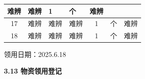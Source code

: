 \documentclass[UTF8,10pt,a4paper,fontset=fandol]{ctexart}
\newcommand{\fieldvalue}[1]{#1}
\newcommand{\handwritten}[1]{#1}
\begin{document}
\begin{tabularx}{\textwidth}{c|X|X|X|c|c|X}
\fieldvalue{\handwritten{难辨}} &
\fieldvalue{\handwritten{难辨}} &
\fieldvalue{\handwritten{1}} &
个 &
\fieldvalue{\handwritten{难辨}}\\
\hline
17 &
\fieldvalue{\handwritten{难辨}} &
\fieldvalue{\handwritten{难辨}} &
\fieldvalue{\handwritten{难辨}} &
\fieldvalue{\handwritten{1}} &
个 &
\fieldvalue{\handwritten{难辨}}\\
\hline
18 &
\fieldvalue{\handwritten{难辨}} &
\fieldvalue{\handwritten{难辨}} &
\fieldvalue{\handwritten{难辨}} &
\fieldvalue{\handwritten{1}} &
个 &
\fieldvalue{\handwritten{难辨}}\\
\hline
\end{tabularx}

\noindent
领用日期：\fieldvalue{\handwritten{2025.6.18}}

\bigskip

\noindent
\textbf{3.13 物资领用登记}
\end{document}
